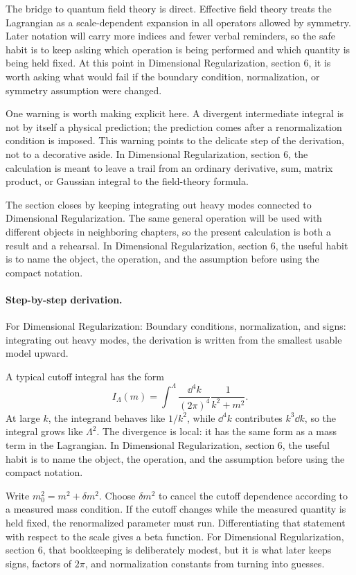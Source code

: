 The bridge to quantum field theory is direct.  Effective field theory treats the Lagrangian as a scale-dependent expansion in all operators allowed by symmetry.  Later notation will carry more indices and fewer verbal reminders, so the safe habit is to keep asking which operation is being performed and which quantity is being held fixed.  At this point in Dimensional Regularization, section 6, it is worth asking what would fail if the boundary condition, normalization, or symmetry assumption were changed.

One warning is worth making explicit here.  A divergent intermediate integral is not by itself a physical prediction; the prediction comes after a renormalization condition is imposed.  This warning points to the delicate step of the derivation, not to a decorative aside.  In Dimensional Regularization, section 6, the calculation is meant to leave a trail from an ordinary derivative, sum, matrix product, or Gaussian integral to the field-theory formula.

The section closes by keeping integrating out heavy modes connected to Dimensional Regularization.  The same general operation will be used with different objects in neighboring chapters, so the present calculation is both a result and a rehearsal.  In Dimensional Regularization, section 6, the useful habit is to name the object, the operation, and the assumption before using the compact notation.



\paragraph{Step-by-step derivation.}

For Dimensional Regularization: Boundary conditions, normalization, and signs: integrating out heavy modes, the derivation is written from the smallest usable model upward.

A typical cutoff integral has the form
\[
  I_\Lambda(m)=\int^{\Lambda}\frac{\dd^4k}{(2\pi)^4}\frac{1}{k^2+m^2}.
\]
At large \(k\), the integrand behaves like \(1/k^2\), while \(\dd^4k\) contributes \(k^3\dd k\), so the integral grows like \(\Lambda^2\).  The divergence is local: it has the same form as a mass term in the Lagrangian.  In Dimensional Regularization, section 6, the useful habit is to name the object, the operation, and the assumption before using the compact notation.

Write \(m_0^2=m^2+\delta m^2\).  Choose \(\delta m^2\) to cancel the cutoff dependence according to a measured mass condition.  If the cutoff changes while the measured quantity is held fixed, the renormalized parameter must run.  Differentiating that statement with respect to the scale gives a beta function.  For Dimensional Regularization, section 6, that bookkeeping is deliberately modest, but it is what later keeps signs, factors of \(2\pi\), and normalization constants from turning into guesses.

